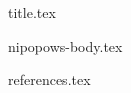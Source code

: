 \documentclass[11pt]{llncs}
\begin{document}
{title.tex}
\begin{abstract}

\end{abstract}
\thispagestyle{plain}
{nipopows-body.tex}

{references.tex}
\end{document}
